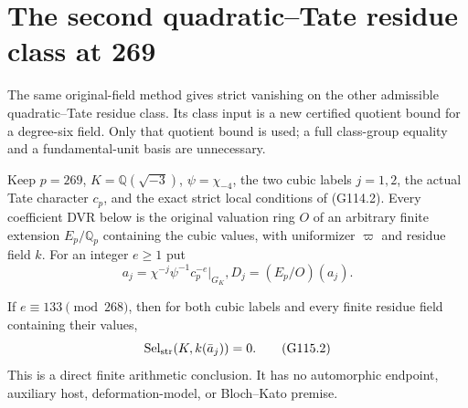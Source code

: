 \section{The second quadratic--Tate residue class at 269}
\label{sec:cubic-second-residue-strict-vanishing}

The same original-field method gives strict vanishing on the other
admissible quadratic--Tate residue class.  Its class input is a new
certified quotient bound for a degree-six field.  Only that quotient
bound is used; a full class-group equality and a fundamental-unit
basis are unnecessary.

Keep $p=269$, $K=\mathbb Q(\sqrt{-3})$, $\psi=\chi_{-4}$,
the two cubic labels $j=1,2$, the actual Tate character $c_p$,
and the exact strict local conditions of (G114.2).
Every coefficient DVR below is the original valuation ring $O$ of
an arbitrary finite extension $E_p/\mathbb Q_p$ containing the cubic
values, with uniformizer $\varpi$ and residue field $k$.
For an integer $e\ge1$ put
\[
       a_j=\chi^{-j}\psi^{-1}c_p^{-e}|_{G_K},
       D_j=(E_p/O)(a_j).
 \tag{G115.1}
\]

\begin{theorem}
\label{thm:ACG115residual}
If $e\equiv133\pmod{268}$, then for both cubic labels and every
finite residue field containing their values,
\[
              \operatorname{Sel}_{\rm str}(K,k(\bar a_j))=0.
 \tag{G115.2}
\]
This is a direct finite arithmetic conclusion.  It has no
automorphic endpoint, auxiliary host, deformation-model, or
Bloch--Kato premise.
\end{theorem}

